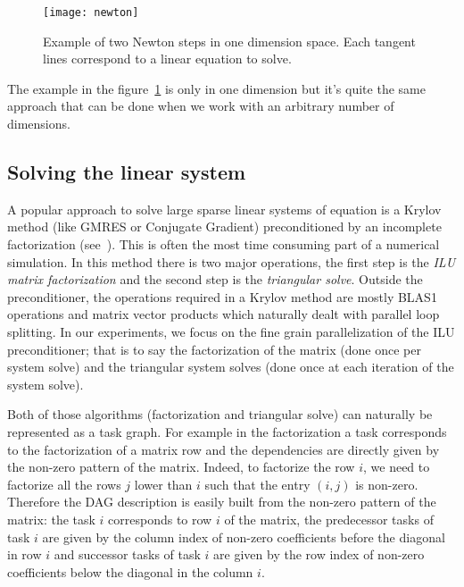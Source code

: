 \begin{figure}[!ht]
  \centering
  \texttt{[image: newton]}
  \caption{Example of two Newton steps in one dimension space.
    Each tangent lines correspond to a linear equation to solve.}
  \label{newton}
\end{figure}

The example in the figure~\ref{newton} is only in one dimension but it's quite the same approach that can be done when we work with an arbitrary number of dimensions.


\subsection{Solving the linear system}
A popular approach to solve large sparse linear systems of equation is a Krylov
method (like GMRES or Conjugate Gradient) preconditioned by an incomplete
factorization (see~\cite{Saad96IMSLS}).
%
This is often the most time consuming part of a numerical simulation.
%
In this method there is two major operations, the first step is the {\em ILU matrix factorization}
and the second step is the {\em triangular solve}.
Outside the preconditioner, the operations required in a Krylov method are
mostly BLAS1 operations and matrix vector products which naturally dealt with
parallel loop splitting.
In our experiments, we focus on the fine grain parallelization of
the ILU preconditioner; that is to say the factorization of the matrix (done once per system solve) and
the triangular system solves (done once at each iteration of the system solve).


Both of those algorithms (factorization and triangular solve) can naturally be represented as a task graph. For example in the factorization
a task corresponds to the factorization of a matrix row and the dependencies are directly given by the non-zero pattern of the matrix.
Indeed, to factorize the row $i$, we need to factorize all the rows $j$ lower than $i$
such that the entry $(i,j)$ is non-zero.
Therefore the DAG description is easily built from the non-zero pattern of the matrix:
the task $i$ corresponds to row $i$ of the matrix, the predecessor tasks of task $i$ are given by the column index of non-zero coefficients before the diagonal in row $i$
 and successor tasks of task $i$ are given by the row index of non-zero coefficients below the diagonal in the column $i$.

